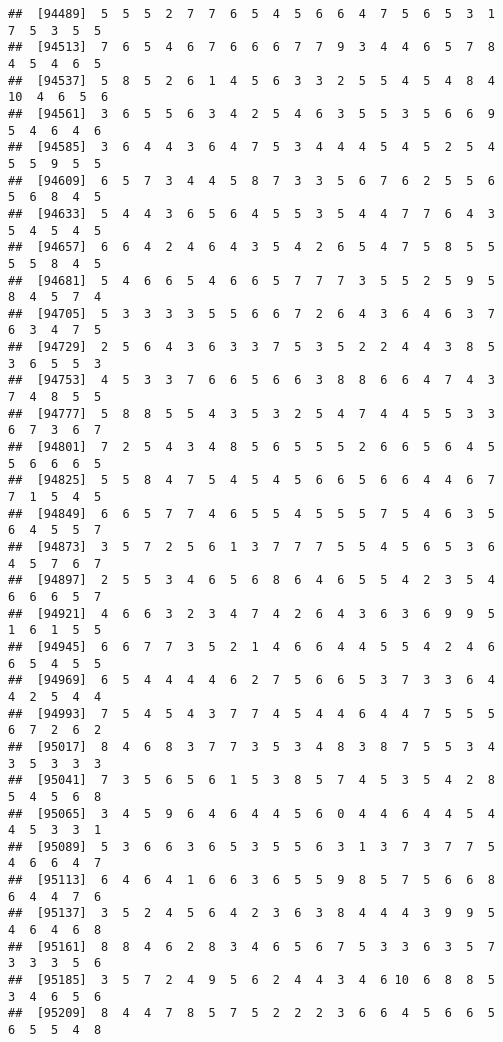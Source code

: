 \documentclass[
]{book}
\begin{document}
\begin{verbatim}
##  [94489]  5  5  5  2  7  7  6  5  4  5  6  6  4  7  5  6  5  3  1  7  5  3  5  5
##  [94513]  7  6  5  4  6  7  6  6  6  7  7  9  3  4  4  6  5  7  8  4  5  4  6  5
##  [94537]  5  8  5  2  6  1  4  5  6  3  3  2  5  5  4  5  4  8  4 10  4  6  5  6
##  [94561]  3  6  5  5  6  3  4  2  5  4  6  3  5  5  3  5  6  6  9  5  4  6  4  6
##  [94585]  3  6  4  4  3  6  4  7  5  3  4  4  4  5  4  5  2  5  4  5  5  9  5  5
##  [94609]  6  5  7  3  4  4  5  8  7  3  3  5  6  7  6  2  5  5  6  5  6  8  4  5
##  [94633]  5  4  4  3  6  5  6  4  5  5  3  5  4  4  7  7  6  4  3  5  4  5  4  5
##  [94657]  6  6  4  2  4  6  4  3  5  4  2  6  5  4  7  5  8  5  5  5  5  8  4  5
##  [94681]  5  4  6  6  5  4  6  6  5  7  7  7  3  5  5  2  5  9  5  8  4  5  7  4
##  [94705]  5  3  3  3  3  5  5  6  6  7  2  6  4  3  6  4  6  3  7  6  3  4  7  5
##  [94729]  2  5  6  4  3  6  3  3  7  5  3  5  2  2  4  4  3  8  5  3  6  5  5  3
##  [94753]  4  5  3  3  7  6  6  5  6  6  3  8  8  6  6  4  7  4  3  7  4  8  5  5
##  [94777]  5  8  8  5  5  4  3  5  3  2  5  4  7  4  4  5  5  3  3  6  7  3  6  7
##  [94801]  7  2  5  4  3  4  8  5  6  5  5  5  2  6  6  5  6  4  5  5  6  6  6  5
##  [94825]  5  5  8  4  7  5  4  5  4  5  6  6  5  6  6  4  4  6  7  7  1  5  4  5
##  [94849]  6  6  5  7  7  4  6  5  5  4  5  5  5  7  5  4  6  3  5  6  4  5  5  7
##  [94873]  3  5  7  2  5  6  1  3  7  7  7  5  5  4  5  6  5  3  6  4  5  7  6  7
##  [94897]  2  5  5  3  4  6  5  6  8  6  4  6  5  5  4  2  3  5  4  6  6  6  5  7
##  [94921]  4  6  6  3  2  3  4  7  4  2  6  4  3  6  3  6  9  9  5  1  6  1  5  5
##  [94945]  6  6  7  7  3  5  2  1  4  6  6  4  4  5  5  4  2  4  6  6  5  4  5  5
##  [94969]  6  5  4  4  4  4  6  2  7  5  6  6  5  3  7  3  3  6  4  4  2  5  4  4
##  [94993]  7  5  4  5  4  3  7  7  4  5  4  4  6  4  4  7  5  5  5  6  7  2  6  2
##  [95017]  8  4  6  8  3  7  7  3  5  3  4  8  3  8  7  5  5  3  4  3  5  3  3  3
##  [95041]  7  3  5  6  5  6  1  5  3  8  5  7  4  5  3  5  4  2  8  5  4  5  6  8
##  [95065]  3  4  5  9  6  4  6  4  4  5  6  0  4  4  6  4  4  5  4  4  5  3  3  1
##  [95089]  5  3  6  6  3  6  5  3  5  5  6  3  1  3  7  3  7  7  5  4  6  6  4  7
##  [95113]  6  4  6  4  1  6  6  3  6  5  5  9  8  5  7  5  6  6  8  6  4  4  7  6
##  [95137]  3  5  2  4  5  6  4  2  3  6  3  8  4  4  4  3  9  9  5  4  6  4  6  8
##  [95161]  8  8  4  6  2  8  3  4  6  5  6  7  5  3  3  6  3  5  7  3  3  3  5  6
##  [95185]  3  5  7  2  4  9  5  6  2  4  4  3  4  6 10  6  8  8  5  3  4  6  5  6
##  [95209]  8  4  4  7  8  5  7  5  2  2  2  3  6  6  4  5  6  6  5  6  5  5  4  8

\end{verbatim}
\end{document}
